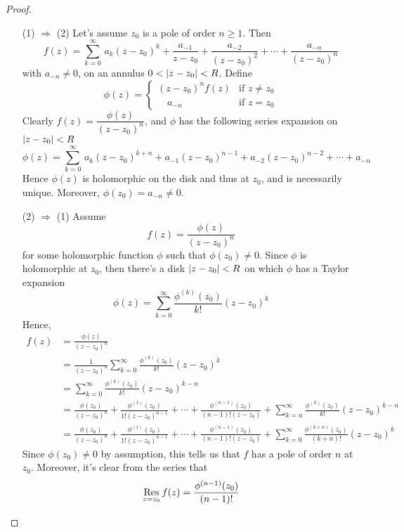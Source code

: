 \begin{proof}\hfill
\begin{itemize}[leftmargin=4.5em,itemsep=1.5em]
\item[(1) $\Rightarrow$ (2)] Let's assume $z_0$ is a pole of order $n \geq 1$. Then
\[f(z) = \sum_{k=0}^\infty\,a_k(z - z_0)^k + \frac{a_{-1}}{z - z_0} + \frac{a_{-2}}{(z - z_0)^2} + \cdots + \frac{a_{-n}}{(z - z_0)^n}\]
with $a_{-n} \neq 0$, on an annulus $0 < \left\lvert z - z_0\right\rvert < R$. Define
\[\phi(z) = \begin{cases} (z - z_0)^nf(z) & \text{if } z \neq z_0\\[0.5em] \quad a_{-n} & \text{if } z = z_0 \end{cases}\]
Clearly $f(z) = \dfrac{\phi(z)}{(z - z_0)^n}$, and $\phi$ has the following series expansion on $\left\lvert z - z_0\right\rvert < R$
\[\phi(z) = \sum_{k=0}^\infty\,a_k(z - z_0)^{k + n} + a_{-1}(z - z_0)^{n-1} + a_{-2}(z - z_0)^{n-2} + \cdots + a_{-n}\]
Hence $\phi(z)$ is holomorphic on the disk and thus at $z_0$, and is necessarily unique. Moreover, $\phi(z_0) = a_{-n} \neq 0$.

\item[(2) $\Rightarrow$ (1)] Assume
\[f(z) = \frac{\phi(z)}{(z - z_0)^n}\]
for some holomorphic function $\phi$ such that $\phi(z_0) \neq 0$. Since $\phi$ is holomorphic at $z_0$, then there's a disk $\left\lvert z - z_0\right\rvert < R$ on which $\phi$ has a Taylor expansion
\[\phi(z) = \sum_{k=0}^\infty \frac{\phi^{(k)}(z_0)}{k!}(z - z_0)^k\]
Hence,
\begin{align*}
f(z) &= \frac{\phi(z)}{(z - z_0)^n}\\[0.5em]
 &= \frac{1}{(z - z_0)^n}\sum_{k=0}^\infty \frac{\phi^{(k)}(z_0)}{k!}(z - z_0)^k\\[0.5em]
 &= \sum_{k=0}^\infty \frac{\phi^{(k)}(z_0)}{k!}(z - z_0)^{k - n}\\[0.5em]
 &= \frac{\phi(z_0)}{(z - z_0)^n} + \frac{\phi^{(1)}(z_0)}{1!(z - z_0)^{n - 1}} + \cdots + \frac{\phi^{(n-1)}(z_0)}{(n-1)!(z - z_0)} + \sum_{k=n}^\infty \frac{\phi^{(k)}(z_0)}{k!}(z - z_0)^{k - n}\\[0.5em]
 &= \frac{\phi(z_0)}{(z - z_0)^n} + \frac{\phi^{(1)}(z_0)}{1!(z - z_0)^{n - 1}} + \cdots + \frac{\phi^{(n-1)}(z_0)}{(n-1)!(z - z_0)} + \sum_{k=0}^\infty \frac{\phi^{(k + n)}(z_0)}{(k+n)!}(z - z_0)^{k}
\end{align*}
Since $\phi(z_0) \neq 0$ by assumption, this tells us that $f$ has a pole of order $n$ at $z_0$. Moreover, it's clear from the series that
\[\underset{z = {z_0}}{\operatorname{Res}}\,f(z) = \frac{\phi^{(n-1)}(z_0)}{(n-1)!}\]
\end{itemize}
\vspace*{-\baselineskip}
\end{proof}

